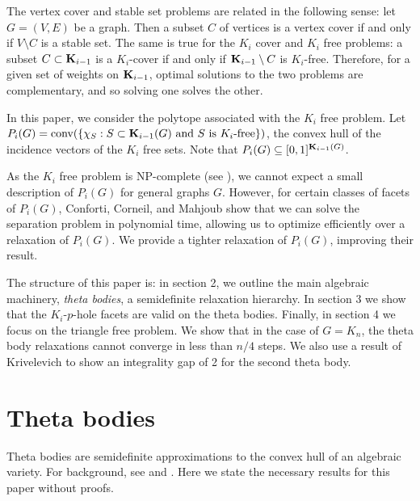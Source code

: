 The vertex cover and stable set problems are related in the following sense: let $G = (V,E)$ be a graph. Then a subset $C$ of vertices is a vertex cover if and only if $V \setminus C$ is a stable set. The same is true for the $K_i$ cover and $K_i$ free problems: a subset $C \subset \mathbf{K}_{i-1}$ is a $K_i$-cover if and only if $\mathbf{K}_{i-1} \setminus C$ is $K_i$-free. Therefore, for a given set of weights on $\mathbf{K}_{i-1}$, optimal solutions to the two problems are complementary, and so solving one solves the other.

In this paper, we consider the polytope associated with the $K_i$ free problem. Let 
$P_i(G) = \hbox{conv}(\{\chi_S: S \subset \mathbf{K}_{i-1}(G) \text{ and $S$ is $K_i$-free}\})$, 
the convex hull of the incidence vectors of the $K_i$ free sets. Note that $P_i(G) \subseteq [0,1]^{\mathbf{K}_{i-1}(G)}$.

As the $K_i$ free problem is NP-complete (see \cite{conforti}), we cannot expect a small description of $P_i(G)$ for general graphs $G$. However, for certain classes of facets of $P_i(G)$, Conforti, Corneil, and Mahjoub \cite{conforti} show that we can solve the separation problem in polynomial time, allowing us to optimize efficiently over a relaxation of $P_i(G)$. We provide a tighter relaxation of $P_i(G)$, improving their result.

The structure of this paper is: in section 2, we outline the main algebraic machinery, {\em theta bodies}, a semidefinite relaxation hierarchy. In section 3 we show that the $K_i$-$p$-hole facets are valid on the theta bodies. Finally, in section 4 we focus on the triangle free problem. We show that in the case of $G = K_n$, the theta body relaxations cannot converge in less than $n/4$ steps. We also use a result of Krivelevich to show an integrality gap of 2 for the second theta body.

\section{Theta bodies}
Theta bodies are semidefinite approximations to the convex hull of an algebraic variety. For background, see \cite{frg} and \cite{gpt}. Here we state the necessary results for this paper without proofs.

